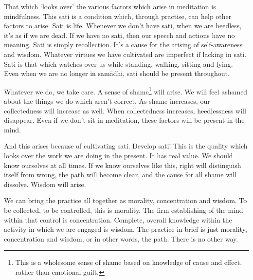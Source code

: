 That which `looks over' the various factors which arise in meditation is  mindfulness. This sati is a condition which, through practise, can help other factors to arise. Sati is life. Whenever we don't have sati, when we are heedless, it's as if we are dead. If we have no sati, then our speech and actions have no meaning. Sati is simply recollection. It's a cause for the arising of self-awareness and wisdom. Whatever virtues we have cultivated are imperfect if lacking in sati. Sati is that which watches over us while standing, walking, sitting and lying. Even when we are no longer in sam\=adhi, sati should be present throughout. 

Whatever we do, we take care. A sense of shame\footnote{This is a wholesome sense of shame based on knowledge of cause and effect, rather than emotional guilt.} will arise. We will feel ashamed about the things we do which aren't correct. As shame increases, our collectedness will increase as well. When collectedness increases, heedlessness will disappear. Even if we don't sit in meditation, these factors will be present in the mind. 

And this arises because of cultivating sati. Develop sati! This is the quality which looks over the work we are doing in the present. It has real value. We should know ourselves at all times. If we know ourselves like this, right will distinguish itself from wrong, the path will become clear, and the cause for all shame will dissolve. Wisdom will arise. 

We can bring the practice all together as morality, concentration and wisdom. To be collected, to be controlled, this is morality. The firm establishing of the mind within that control is concentration. Complete, overall knowledge within the activity in which we are engaged is wisdom. The practice in brief is just morality, concentration and wisdom, or in other words, the path. There is no other way.
